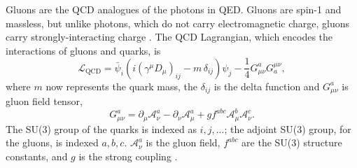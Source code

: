Gluons are the QCD analogues of the photons in QED. Gluons are spin-1 and massless, but unlike photons, which do not carry electromagnetic charge, gluons carry strongly-interacting charge \cite{Wilczek:2000ih}. The QCD Lagrangian, which encodes the interactions of gluons and quarks, is
\begin{equation}
{\mathcal {L}}_{\mathrm {QCD} }={\bar {\psi }}_{i}\left(i(\gamma ^{\mu }D_{\mu })_{ij}-m\,\delta _{ij}\right)\psi _{j}-{\frac {1}{4}}G_{\mu \nu }^{a}G_{a}^{\mu \nu },
\end{equation}
where $m$ now represents the quark mass, the $\delta_{ij}$ is the delta function and $G_{\mu \nu }^{a}$ is gluon field tensor,  
\begin{equation}
\displaystyle G_{\mu \nu }^{a}=\partial _{\mu }{\mathcal {A}}_{\nu }^{a}-\partial _{\nu }{\mathcal {A}}_{\mu }^{a}+gf^{abc}{\mathcal {A}}_{\mu }^{b}{\mathcal {A}}_{\nu }^{c}.
\end{equation}
The SU(3) group of the quarks is indexed as $i,j,...$; the adjoint SU(3) group, for the gluons, is indexed $a,b,c$. ${\mathcal {A}}_{\nu }^{a}$ is the gluon field, $f^{abc}$ are the SU(3) structure constants, and $g$ is the strong coupling \cite{Schafer:2005ff}. 


